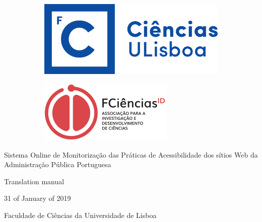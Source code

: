 \pagestyle{empty}

\begin{center}
    \begin{figure}
        \begin{subfigure}{.5\textwidth}
            \centering
            \includegraphics[width=.7\linewidth]{lib/images/logo/fcul_logo.png}
        \end{subfigure}
        \begin{subfigure}{.5\textwidth}
            \centering
            \includegraphics[width=.7\linewidth]{lib/images/logo/FCiencias_ID.png}
        \end{subfigure}
    \end{figure}
    
    \vspace*{3cm}
    
    \Large{Sistema Online de Monitorização das Práticas de Acessibilidade dos sítios Web da Administração Pública Portuguesa}\\
    \vspace{1cm}
    \vfill

    \large{Translation manual}\\
    \vspace{1.5cm}
    
    \vspace{1.2cm}
    
    \vfill
    31 of January of 2019
    
    \vspace{1.5 cm}
    \vfill
    
    Faculdade de Ciências da Universidade de Lisboa
    
    \vfill
    
\end{center}